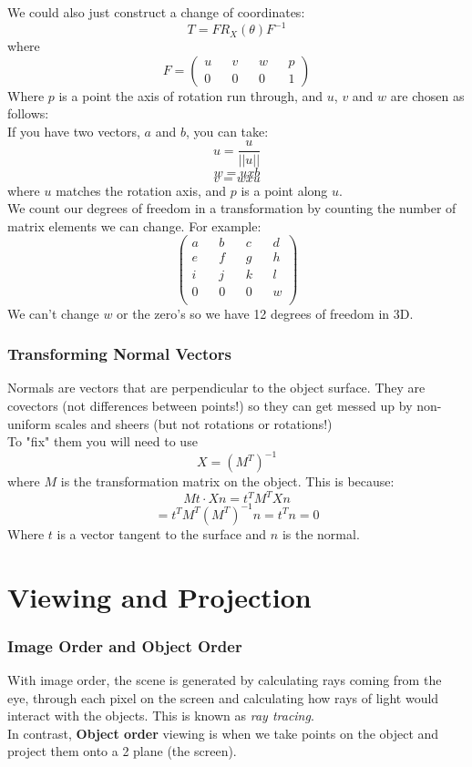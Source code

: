 \documentclass[12pt]{article}
\theoremstyle{definition}
\begin{document}
We could also just construct a change of coordinates: 
$$T = FR_X(\theta)F^{-1}$$ 
where $$F = \begin{pmatrix}
u && v && w && p \\
0 && 0 && 0 && 1
\end{pmatrix}$$
Where $p$ is a point the axis of rotation run through, and $u$, $v$ and $w$ are chosen as follows:
\\ \linebreak
If you have two vectors, $a$ and $b$, you can take:
$$ u = \frac{u}{||u||}$$
$$ w = u x b $$
$$ v = w x u $$ 
where $u$ matches the rotation axis, and $p$ is a point along $u$.
\\ \linebreak
We count our degrees of freedom in a transformation by counting the number of matrix elements we can change. For example:
$$\begin{pmatrix}
	a && b && c && d \\
	e && f && g && h \\
	i && j && k && l \\
	0 && 0 && 0 && w \\
\end{pmatrix}$$
We can't change $w$ or the zero's so we have 12 degrees of freedom in 3D.
\section{Transforming Normal Vectors}
Normals are vectors that are perpendicular to the object surface. They are covectors (not differences between points!) so they can get messed up by non-uniform scales and sheers (but not rotations or rotations!)
\\ \linebreak
To "fix" them you will need to use $$X = (M^T)^{-1}$$ where $M$ is the transformation matrix on the object. This is because: $$Mt \cdot Xn = t^TM^TXn$$
$$= t^TM^T(M^T)^{-1}n = t^Tn = 0$$
Where $t$ is a vector tangent to the surface and $n$ is the normal.
\\ \linebreak


\part{Viewing and Projection}
\section{Image Order and Object Order}
With image order, the scene is generated by calculating rays coming from the eye, through each pixel on the screen and calculating how rays of light would interact with the objects. This is known as \textit{ray tracing}.
\\ \linebreak
In contrast, \textbf{Object order} viewing is when we take points on the object and project them onto a 2 plane (the screen). 
\end{document}
